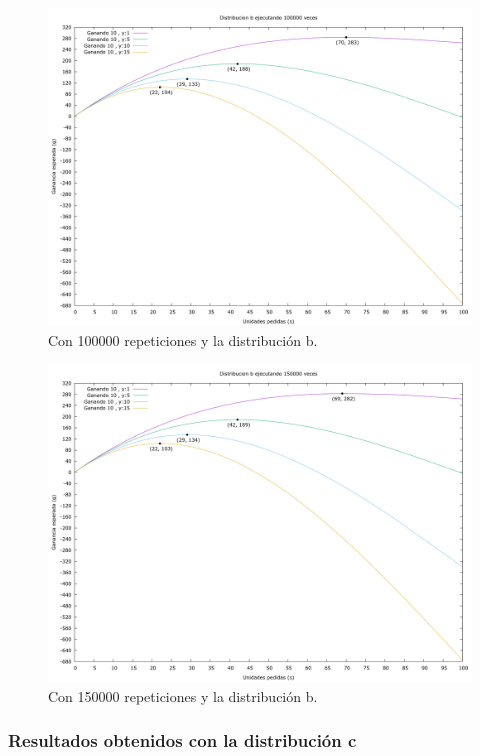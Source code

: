 \documentclass[12pt, spanish]{article}
\begin{document}
\begin{figure}[H]
	\centering
	\includegraphics[scale = 0.3]{prob_b/datos_b_100000.png}
	\caption{Con 100000 repeticiones y la distribución b.}
	\label{fig:ej1_a_100000}

\end{figure}

\begin{figure}[H]
	\centering
	\includegraphics[scale = 0.3]{prob_b/datos_b_150000.png}
	\caption{Con 150000 repeticiones y la distribución b.}
	\label{fig:ej1_a_150000}

\end{figure}


\subsubsection{Resultados obtenidos con la distribución c}
\end{document}
